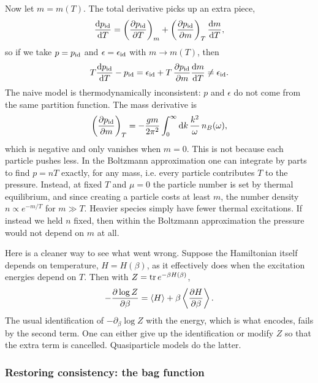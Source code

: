 Now let $m=m(T)$. The total derivative picks up an extra piece,
\begin{equation}\label{eq:qpchain}
  \dv{p_{\rm id}}{T}=\left(\pdv{p_{\rm id}}{T}\right)_{m}
     +\left(\pdv{p_{\rm id}}{m}\right)_{T}\dv{m}{T},
\end{equation}
so if we take $p=p_{\rm id}$ and $\epsilon=\epsilon_{\rm id}$ with
$m\to m(T)$, then
\begin{equation}
  T\dv{p_{\rm id}}{T}-p_{\rm id}=\epsilon_{\rm id}
     +T\,\pdv{p_{\rm id}}{m}\dv{m}{T}\neq\epsilon_{\rm id}.
\end{equation}
The naive model is thermodynamically inconsistent: $p$ and $\epsilon$
do not come from the same partition function. The mass derivative is
\begin{equation}\label{eq:dPdm}
  \left(\pdv{p_{\rm id}}{m}\right)_{T}
    =-\frac{gm}{2\pi^2}\int_0^\infty\dd{k}\frac{k^2}{\omega}\,n_B(\omega),
\end{equation}
which is negative and only vanishes when $m=0$. This is not because each
particle pushes less. In the Boltzmann approximation one can integrate by parts
to find $p=nT$ exactly, for any mass, i.e. every particle contributes $T$ to the
pressure. Instead, at fixed $T$ and $\mu=0$ the particle number is set by
thermal equilibrium, and since creating a particle costs at least $m$, the
number density $n\propto e^{-m/T}$ for $m\gg T$. Heavier species simply have
fewer thermal excitations. If instead we held $n$ fixed, then within the Boltzmann
approximation the pressure would not depend on $m$ at all.

Here is a cleaner way to see what went wrong. Suppose the Hamiltonian
itself depends on temperature, $H=H(\beta)$, as it effectively does when
the excitation energies depend on $T$. Then with $Z=\tr e^{-\beta H(\beta)}$,
\begin{equation}
  -\pdv{\log Z}{\beta}=\expval{H}+\beta\expval{\pdv{H}{\beta}}.
\end{equation}
The usual identification of $-\partial_\beta\log Z$ with the energy, which
is what  encodes, fails by the second term. One can
either give up the identification or modify $Z$ so that the extra term is
cancelled. Quasiparticle models do the latter.

\subsubsection{Restoring consistency: the bag function}

